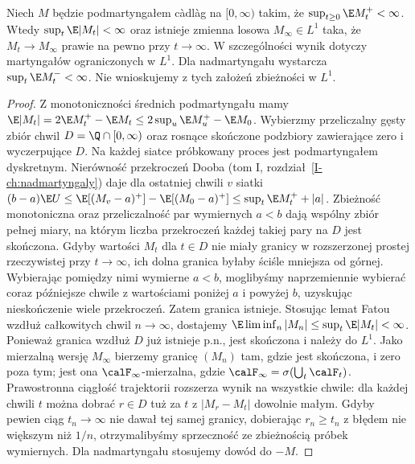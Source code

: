 \begin{twierdzenie}
\label{thm:mart-cont-convergence}
Niech $M$ będzie podmartyngałem c\`adl\`ag na
$[0,\infty)$ takim, że $\sup_{t\ge0}\E M_t^+<\infty$.
Wtedy $\sup_t\E|M_t|<\infty$ oraz istnieje zmienna
losowa $M_\infty\in L^1$ taka, że
$M_t\to M_\infty$ prawie na pewno przy $t\to\infty$.
W szczególności wynik dotyczy martyngałów ograniczonych
w $L^1$. Dla nadmartyngału wystarcza
$\sup_t\E M_t^-<\infty$.
Nie wnioskujemy z tych założeń zbieżności w $L^1$.
\end{twierdzenie}
\begin{proof}
Z monotoniczności średnich podmartyngału mamy
$\E|M_t|=2\E M_t^+-\E M_t\le2\sup_u\E M_u^+-\E M_0$.
Wybierzmy przeliczalny gęsty zbiór chwil
$D=\Q\cap[0,\infty)$ oraz rosnące skończone
podzbiory zawierające zero i wyczerpujące $D$.
Na każdej siatce próbkowany proces jest
podmartyngałem dyskretnym. Nierówność przekroczeń
Dooba (tom I, rozdział~\ref{I-ch:nadmartyngaly})
daje dla ostatniej chwili $v$ siatki
$(b-a)\E U\le\E[(M_v-a)^+]-\E[(M_0-a)^+]
\le\sup_t\E M_t^++|a|$.
Zbieżność monotoniczna oraz przeliczalność
par wymiernych $a<b$ dają wspólny zbiór pełnej
miary, na którym liczba przekroczeń każdej
takiej pary na $D$ jest skończona.
Gdyby wartości $M_t$ dla $t\in D$ nie miały granicy
w rozszerzonej prostej rzeczywistej przy $t\to\infty$,
ich dolna granica byłaby ściśle mniejsza od górnej.
Wybierając pomiędzy nimi wymierne $a<b$,
moglibyśmy naprzemiennie wybierać coraz późniejsze
chwile z wartościami poniżej $a$ i powyżej $b$,
uzyskując nieskończenie wiele przekroczeń.
Zatem granica istnieje.
Stosując lemat Fatou wzdłuż całkowitych chwil
$n\to\infty$, dostajemy
$\E\liminf_n |M_n|\le\sup_t\E|M_t|<\infty$.
Ponieważ granica wzdłuż $D$ już istnieje p.n.,
jest skończona i należy do $L^1$.
Jako mierzalną wersję $M_\infty$ bierzemy granicę
$(M_n)$ tam, gdzie jest skończona, i zero poza tym;
jest ona $\calF_\infty$-mierzalna, gdzie
$\calF_\infty=\sigma(\bigcup_t\calF_t)$.
Prawostronna ciągłość trajektorii rozszerza wynik
na wszystkie chwile: dla każdej chwili $t$
można dobrać $r\in D$ tuż za $t$ z
$|M_r-M_t|$ dowolnie małym. Gdyby pewien ciąg
$t_n\to\infty$ nie dawał tej samej granicy,
dobierając $r_n\ge t_n$ z błędem nie większym niż
$1/n$, otrzymalibyśmy sprzeczność ze zbieżnością
próbek wymiernych.
Dla nadmartyngału stosujemy dowód do $-M$.
\end{proof}

